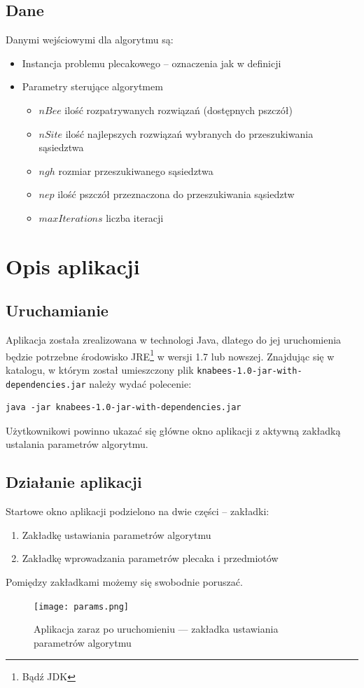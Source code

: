 \documentclass[a4paper,12pt,notitlepage]{mwrep}
\begin{document}
\section{Dane}
Danymi wejściowymi dla algorytmu są:
\begin{itemize}
\item Instancja problemu plecakowego -- oznaczenia jak w definicji
\item Parametry sterujące algorytmem
\begin{itemize}
\item $nBee$ ilość rozpatrywanych rozwiązań (dostępnych pszczół)
\item $nSite$ ilość najlepszych rozwiązań wybranych do przeszukiwania sąsiedztwa
\item $ngh$ rozmiar przeszukiwanego sąsiedztwa
\item $nep$ ilość pszczół przeznaczona do przeszukiwania sąsiedztw
\item $maxIterations$ liczba iteracji
\end{itemize}
\end{itemize}

\chapter{Opis aplikacji}
\section{Uruchamianie}
Aplikacja została zrealizowana w technologi Java, dlatego do jej uruchomienia będzie
potrzebne środowisko JRE\footnote{Bądź JDK} w wersji 1.7 lub nowszej.
Znajdując się w katalogu, w którym został umieszczony plik \texttt{knabees-1.0-jar-with-dependencies.jar}
należy wydać polecenie:
\begin{verbatim}
java -jar knabees-1.0-jar-with-dependencies.jar
\end{verbatim}
Użytkownikowi powinno ukazać się główne okno aplikacji z aktywną zakładką ustalania parametrów
algorytmu.

\section{Działanie aplikacji}
Startowe okno aplikacji podzielono na dwie części -- zakładki:
\begin{enumerate}
	\item	Zakładkę ustawiania parametrów algorytmu
	\item	Zakładkę wprowadzania parametrów plecaka i przedmiotów
\end{enumerate}
Pomiędzy zakładkami możemy się swobodnie poruszać.
\begin{figure}[H]
\centering
\texttt{[image: params.png]}
\caption{Aplikacja zaraz po uruchomieniu --- zakładka ustawiania parametrów algorytmu}
\label{fig:params}
\end{figure}
\end{document}
